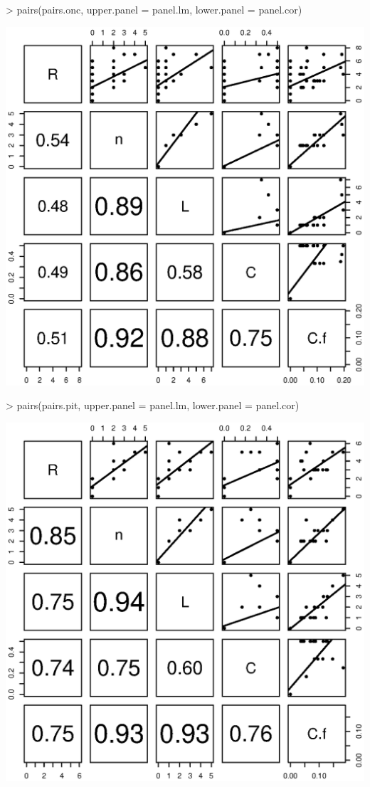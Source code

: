 \documentclass[11pt]{amsart}
\begin{document}
\begin{Schunk}
\begin{Sinput}
> pairs(pairs.onc, upper.panel = panel.lm, lower.panel = panel.cor)
\end{Sinput}
\end{Schunk}
\includegraphics{LCO_analyses-015}

\begin{Schunk}
\begin{Sinput}
> pairs(pairs.pit, upper.panel = panel.lm, lower.panel = panel.cor)
\end{Sinput}
\end{Schunk}
\includegraphics{LCO_analyses-016}
\end{document}
